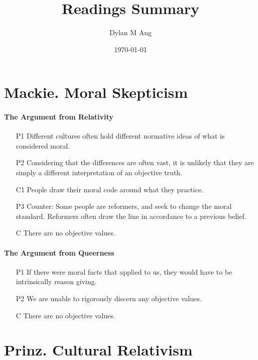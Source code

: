\documentclass[12pt]{article}
\title{Readings Summary}
\author{Dylan M Ang}
\date{\today}
\begin{document}
\maketitle

\tableofcontents

\section{Mackie. Moral Skepticism}

\paragraph{The Argument from Relativity}
\begin{itemize}
    \item [P1] Different cultures often hold different normative ideas of what is considered moral.
    \item [P2] Considering that the differences are often vast, it is unlikely that they are simply a different interpretation of an objective truth.
    \item [C1] People draw their moral code around what they practice.
    \item [P3] Counter: Some people are reformers, and seek to change the moral standard. Reformers often draw the line in accordance to a previous belief. 
    \item [C] There are no objective values.
\end{itemize}

\paragraph{The Argument from Queerness}
\begin{itemize}
    \item [P1] If there were moral facts that applied to us, they would have to be intrinsically reason giving.
    \item [P2] We are unable to rigorously discern any objective values.
    \item [C] There are no objective values.
\end{itemize}

\section{Prinz. Cultural Relativism}
\end{document}
